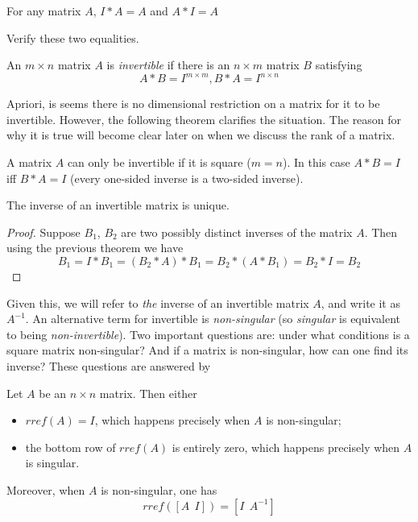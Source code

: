 \documentclass{ximera}
\begin{document}
\begin{proposition} For any matrix $A$, $I*A = A$ and $A*I = A$
\end{proposition}

\begin{exercise} Verify these two equalities.
\end{exercise}

\begin{definition} An $m\times n$ matrix $A$ is {\it invertible} if there is an $n\times m$ matrix $B$ satisfying
\[
A*B = I^{m\times m}, B*A = I^{n\times n}
\]
\end{definition}

Apriori, is seems there is no dimensional restriction on a matrix for it to be invertible. However, the following theorem clarifies the situation. The reason for why it is true will become clear later on when we discuss the rank of a matrix.

\begin{theorem} A matrix $A$ can only be invertible if it is square ($m = n$). In this case $A*B =I$ iff $B*A = I$ (every one-sided inverse is a two-sided inverse).
\end{theorem}

\begin{proposition} The inverse of an invertible matrix is unique.
\end{proposition}

\begin{proof} Suppose $B_1$, $B_2$ are two possibly distinct inverses of the matrix $A$. Then using the previous theorem we have
\[
B_1 = I*B_1 = (B_2*A)*B_1 = B_2*(A*B_1) = B_2*I = B_2
\]
\end{proof}

Given this, we will refer to {\it the} inverse of an invertible matrix $A$, and write it as $A^{-1}$. An alternative term for invertible is {\it non-singular} (so {\it singular} is equivalent to being  {\it non-invertible}). Two important questions are: under what conditions is a square matrix non-singular? And if a matrix is non-singular, how can one find its inverse? These questions are answered by 

\begin{theorem} Let $A$ be an $n\times n$ matrix. Then either
\begin{itemize}
\item $rref(A) = I$, which happens precisely when $A$ is non-singular;
\item the bottom row of $rref(A)$ is entirely zero, which happens precisely when $A$ is singular.
\end{itemize}
Moreover, when $A$ is non-singular, one has
\[
rref([A\ \ I]) = [I\ \ A^{-1}]
\]
\end{theorem}
\end{document}
